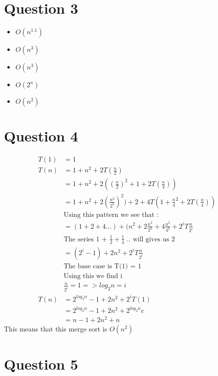 \documentclass{article}
\begin{document}
\section{Question 3}

    \begin{itemize}
        \item $O(n^1.1)$
        \item $O(n^3)$
        \item $O(n^3)$
        \item $O(2^n)$
        \item $O(n^2)$
    \end{itemize}

\section{Question 4}

    \begin{align*}
        T(1) &= 1 \\
        T(n) &= 1 + n^2 + 2T(\frac{n}{2}) \\
        &= 1 + n^2 + 2((\frac{n}{2})^2 + 1 + 2T(\frac{n}{4}))\\
        &= 1 + n^2 + 2(\frac{n^2}{2^2})^2) + 2 + 4T(1 + \frac{n}{4}^2 + 2T(\frac{n}{4}))\\
        &\textrm{Using this pattern we see that :}\\
        &= (1 + 2 + 4 ... ) + (n^2 + 2\frac{n^2}{2^2} + 4\frac{n^2}{4^2} + 2^i T\frac{n}{2^i}\\
        &\textrm{The series 1 + $\frac{1}{2} + \frac{1}{4}$ .. will gives us 2}\\
        &= (2^i -1) + 2n^2 + 2^i T\frac{n}{2^i}\\
        &\textrm{The base case is T(1) = 1}\\
        &\textrm{Using this we find i}\\
        &\frac{n}{2^i} = 1 => log_2 n = i\\
        T(n) &= 2^{log_2 n} - 1 + 2n^2 + 2^i T(1)\\
        &= 2^{log_2 n} - 1 + 2n^2 + 2^{log_2 n} c\\
        &= n - 1 + 2n^2 + n
    \end{align*}
    This means that this merge sort is $O(n^2)$

\section{Question 5}
\end{document}
